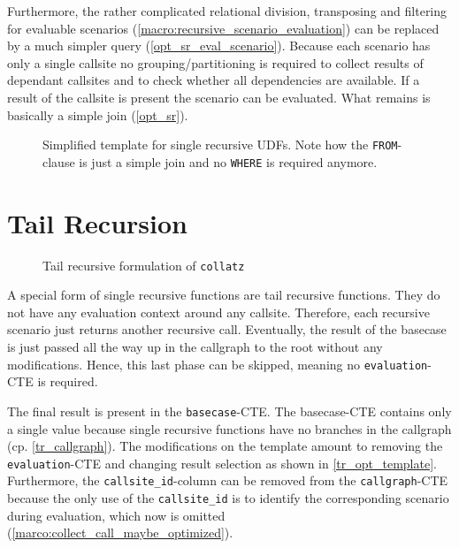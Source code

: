 Furthermore, the rather complicated relational division, transposing and filtering for evaluable scenarios (\autoref{macro:recursive_scenario_evaluation}) can be replaced by a much simpler query (\autoref{opt_sr_eval_scenario}). Because each scenario has only a single callsite no grouping/partitioning is required to collect results of dependant callsites and to check whether all dependencies are available. If a result of the callsite is present the scenario can be evaluated. What remains is basically a simple join (\autoref{opt_sr}).

\begin{figure}[h!]
    \centering
    \caption{Simplified template for single recursive UDFs. Note how the \texttt{FROM}-clause is just a simple join and no \texttt{WHERE} is required anymore.}
    \label{opt_sr_eval_scenario}
\end{figure}



\section{Tail Recursion}

\begin{wrapfigure}{r}{0.5\textwidth}
  \vspace{-10pt}
  \caption{Tail recursive formulation of \texttt{collatz}}
  \label{lst:fib_tr}
\end{wrapfigure}

A special form of single recursive functions are tail recursive functions. They do not have any evaluation context around any callsite. Therefore, each recursive scenario just returns another recursive call. Eventually, the result of the basecase is just passed all the way up in the callgraph to the root without any modifications. Hence, this last phase can be skipped, meaning no \texttt{evaluation}-CTE is required.

The final result is present in the \texttt{basecase}-CTE. The basecase-CTE contains only a single value because single recursive functions have no branches in the callgraph (cp. \autoref{tr_callgraph}). The modifications on the template amount to removing the \texttt{evaluation}-CTE and changing result selection as shown in \autoref{tr_opt_template}. Furthermore, the \texttt{callsite\_id}-column can be removed from the \texttt{callgraph}-CTE because the only use of the \texttt{callsite\_id} is to identify the corresponding scenario during evaluation, which now is omitted (\autoref{marco:collect_call_maybe_optimized}).

